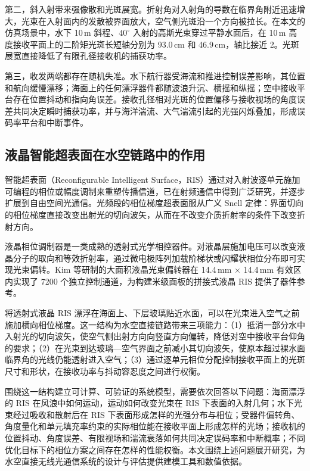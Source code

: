 第二，斜入射带来强像散和光斑展宽。折射角对入射角的导数在临界角附近迅速增大，光束在入射面内的发散被界面放大，空气侧光斑沿一个方向被拉长。在本文的仿真场景中，水下 10\,m 斜程、$40^\circ$ 入射的高斯光束穿过平静水面后，在 10\,m 高度接收平面上的二阶矩光斑长短轴分别为 93.0\,cm 和 46.9\,cm，轴比接近 2。光斑展宽直接降低了有限孔径接收机的捕获功率。

第三，收发两端都存在随机失准。水下航行器受海流和推进控制误差影响，其位置和航向缓慢漂移；海面上的任何漂浮器件都随波浪升沉、横摇和纵摇；空中接收平台存在位置抖动和指向角误差。接收孔径相对光斑的位置偏移与接收视场的角度误差共同决定瞬时捕获功率，并与海洋湍流、大气湍流引起的光强闪烁叠加，形成误码率平台和中断事件。

\subsection{液晶智能超表面在水空链路中的作用}

智能超表面（Reconfigurable Intelligent Surface，RIS）通过对入射波逐单元施加可编程的相位或幅度调制来重塑传播信道，已在射频通信中得到广泛研究，并逐步扩展到自由空间光通信。光频段的相位梯度超表面服从广义 Snell 定律：界面切向的相位梯度直接改变出射光的切向波矢，从而在不改变介质折射率的条件下改变折射方向。

液晶相位调制器是一类成熟的透射式光学相控器件。对液晶层施加电压可以改变液晶分子的取向和等效折射率，通过微电极阵列加载阶梯状或闪耀状相位分布即可实现光束偏转。Kim 等研制的大面积液晶光束偏转器在 14.4\,mm $\times$ 14.4\,mm 有效区内实现了 7200 个独立控制通道，为构建米级面板的拼接式液晶 RIS 提供了器件参考。

将透射式液晶 RIS 漂浮在海面上、下层玻璃贴近水面，可以在光束进入空气之前施加横向相位梯度。这一结构为水空直接链路带来三项能力：（1）抵消一部分水中入射光的切向波矢，使空气侧出射方向向竖直方向偏转，降低对空中接收平台仰角的要求；（2）在光束到达玻璃—空气界面之前减小其切向波矢，使原本超过裸水面临界角的光线仍能透射进入空气；（3）通过逐单元相位分配控制接收平面上的光斑尺寸和形状，在接收功率与抖动容忍度之间进行权衡。

围绕这一结构建立可计算、可验证的系统模型，需要依次回答以下问题：海面漂浮的 RIS 在风浪中如何运动，运动如何改变光束在 RIS 下表面的入射几何；水下光束经过吸收和散射后在 RIS 下表面形成怎样的光强分布与相位；受器件偏转角、角度量化和单元填充率约束的实际相位能在接收平面上形成怎样的光场；接收机的位置抖动、角度误差、有限视场和湍流衰落如何共同决定误码率和中断概率；不同优化目标下的相位方案之间存在怎样的性能权衡。本文围绕上述问题展开研究，为水空直接无线光通信系统的设计与评估提供建模工具和数值依据。

